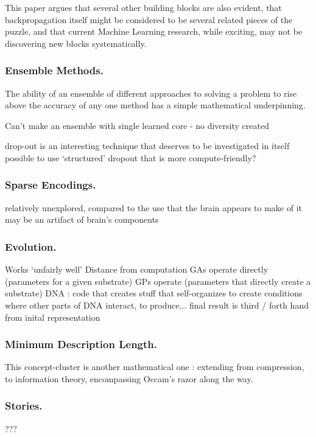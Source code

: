\documentclass[citeauthoryear]{llncs}
\begin{document}
This paper argues that several other building blocks are also evident, 
that backpropagation itself might be considered to be several related pieces of the puzzle,
and that current Machine Learning research, while exciting, may not be
discovering new blocks systematically.



\subsubsection*{Ensemble Methods.}
The ability of an ensemble of different approaches to solving a problem to rise above the accuracy 
of any one method has a simple mathematical underpinning.  

Can't make an ensemble with single learned core - no diversity created

drop-out is an interesting technique that deserves to be investigated in itself
  possible to use `structured' dropout that is more compute-friendly?


\subsubsection*{Sparse Encodings.}
  relatively unexplored, compared to the use that the brain appears to make of it
    may be an artifact of brain's components
    
\subsubsection*{Evolution.}
  Works `unfairly well'
  Distance from computation
    GAs operate directly (parameters for a given substrate)
    GPs operate (parameters that directly create a substrate)
    DNA : code that creates stuff that self-organizes to create conditions where 
      other parts of DNA interact, to produce...   
        final result is third / forth hand from inital representation

\subsubsection*{Minimum Description Length.}
This concept-cluster is another mathematical one : extending from compression, to information theory,
encompassing Occam's razor along the way.

\subsubsection*{Stories.}
  ???
\end{document}

